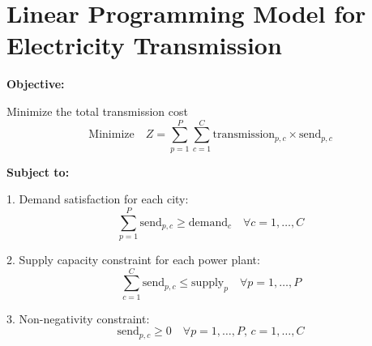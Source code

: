 \documentclass{article}
\begin{document}
\section*{Linear Programming Model for Electricity Transmission}

\textbf{Objective:}

Minimize the total transmission cost
\[
\text{Minimize} \quad Z = \sum_{p=1}^{P} \sum_{c=1}^{C} \text{transmission}_{p,c} \times \text{send}_{p,c}
\]

\textbf{Subject to:}

1. Demand satisfaction for each city:
\[
\sum_{p=1}^{P} \text{send}_{p,c} \geq \text{demand}_c \quad \forall c = 1, \ldots, C
\]

2. Supply capacity constraint for each power plant:
\[
\sum_{c=1}^{C} \text{send}_{p,c} \leq \text{supply}_p \quad \forall p = 1, \ldots, P
\]

3. Non-negativity constraint:
\[
\text{send}_{p,c} \geq 0 \quad \forall p = 1, \ldots, P, \, c = 1, \ldots, C
\]
\end{document}
